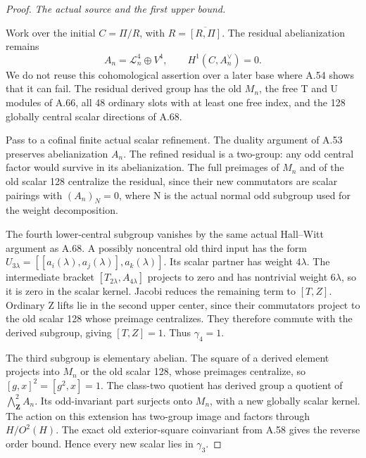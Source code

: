 \begin{proof}
\emph{The actual source and the first upper bound.}\par
Work over the initial \(C=\Pi/R\), with \(R=\overline{[R,\Pi]}\).
The residual abelianization remains
\[
 A_n=\mathcal L_n^4\oplus V^4,
 \qquad H^1(C,A_n^\vee)=0.
 \tag{A.73.2}
\]
We do not reuse this cohomological assertion over a later base where
A.54 shows that it can fail. The residual derived group has the old
\(M_n\), the free T and U modules of A.66, all 48 ordinary slots with
at least one free index, and the 128 globally central scalar
directions of A.68.

Pass to a cofinal finite actual scalar refinement. The duality
argument of A.53 preserves abelianization \(A_n\). The refined
residual is a two-group: any odd central factor would survive in
its abelianization. The full preimages of \(M_n\) and of the old
scalar 128 centralize the residual, since their new commutators
are scalar pairings with \((A_n)_N=0\), where N is the actual
normal odd subgroup used for the weight decomposition.

The fourth lower-central subgroup vanishes by the same actual
Hall--Witt argument as A.68. A possibly noncentral old third input
has the form
\(U_{3\lambda}=[[a_i(\lambda),a_j(\lambda)],a_k(\lambda)]\).
Its scalar partner has weight \(4\lambda\). The intermediate
bracket \([T_{2\lambda},A_{4\lambda}]\) projects to zero and
has nontrivial weight \(6\lambda\), so it is zero in the scalar
kernel. Jacobi reduces the remaining term to \([T,Z]\). Ordinary
Z lifts lie in the second upper center, since their commutators
project to the old scalar 128 whose preimage centralizes. They
therefore commute with the derived subgroup, giving \([T,Z]=1\).
Thus \(\gamma_4=1\).

The third subgroup is elementary abelian. The square of a derived
element projects into \(M_n\) or the old scalar 128, whose preimages
centralize, so
\( [g,x]^2=[g^2,x]=1\).
The class-two quotient has derived group a quotient of
\(\bigwedge^2_{\mathbf Z}A_n\). Its odd-invariant part surjects
onto \(M_n\), with a new globally scalar kernel. The action on
this extension has two-group image and factors through
\(H/O^2(H)\). The exact old exterior-square coinvariant from A.58
gives the reverse order bound. Hence every new scalar lies in
\(\gamma_3\).


\end{proof}
